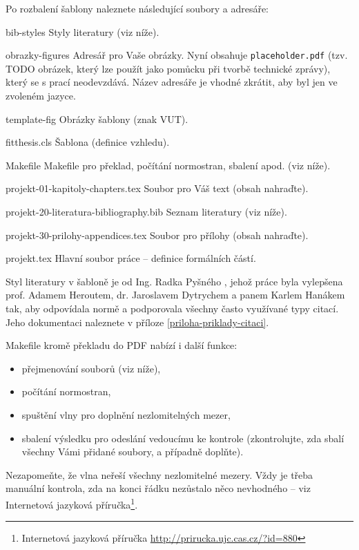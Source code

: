 Po rozbalení šablony naleznete následující soubory a adresáře:
\begin{DESCRIPTION}
  \item [bib-styles] Styly literatury (viz níže). 
  \item [obrazky-figures] Adresář pro Vaše obrázky. Nyní obsahuje \texttt{placeholder.pdf} (tzv. TODO obrázek, který lze použít jako pomůcku při tvorbě technické zprávy), který se s prací neodevzdává. Název adresáře je vhodné zkrátit, aby byl jen ve zvoleném jazyce.
  \item [template-fig] Obrázky šablony (znak VUT).
  \item [fitthesis.cls] Šablona (definice vzhledu).
  \item [Makefile] Makefile pro překlad, počítání normostran, sbalení apod. (viz níže).
  \item [projekt-01-kapitoly-chapters.tex] Soubor pro Váš text (obsah nahraďte).
  \item [projekt-20-literatura-bibliography.bib] Seznam literatury (viz níže).
  \item [projekt-30-prilohy-appendices.tex] Soubor pro přílohy (obsah nahraďte).
  \item [projekt.tex] Hlavní soubor práce -- definice formálních částí.
\end{DESCRIPTION}

Styl literatury v šabloně je od Ing. Radka Pyšného \cite{Pysny}, jehož práce byla vylepšena prof. Adamem Heroutem, dr. Jaroslavem Dytrychem a panem Karlem Hanákem tak, aby odpovídala normě a podporovala všechny často využívané typy citací. Jeho dokumentaci naleznete v příloze \ref{priloha-priklady-citaci}.

\begin{samepage}
Makefile kromě překladu do PDF nabízí i další funkce:
\begin{itemize}
  \item přejmenování souborů (viz níže),
  \item počítání normostran,
  \item spuštění vlny pro doplnění nezlomitelných mezer,
  \item sbalení výsledku pro odeslání vedoucímu ke kontrole (zkontrolujte, zda sbalí všechny Vámi přidané soubory, a případně doplňte).
\end{itemize}
\end{samepage}

Nezapomeňte, že vlna neřeší všechny nezlomitelné mezery. Vždy je třeba manuální kontrola, zda na konci řádku nezůstalo něco nevhodného -- viz Internetová jazyková příručka\footnote{Internetová jazyková příručka \url{http://prirucka.ujc.cas.cz/?id=880}}.

